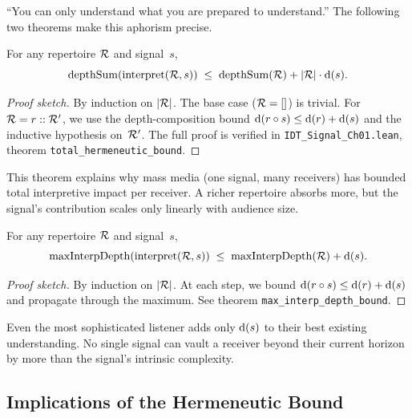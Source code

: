 ``You can only understand what you are prepared to understand.''
The following two theorems make this aphorism precise.

\begin{theorem}
\label{thm:total-hermeneutic-bound}
For any repertoire $\mathcal{R}$ and signal~$s$,
\[
  \operatorname{depthSum}(\operatorname{interpret}(\mathcal{R}, s))
  \;\leq\;
  \operatorname{depthSum}(\mathcal{R}) + |\mathcal{R}| \cdot \operatorname{d}(s).
\]
\end{theorem}

\begin{proof}[Proof sketch]
By induction on $|\mathcal{R}|$.  The base case ($\mathcal{R} = []$) is trivial.
For $\mathcal{R} = r :: \mathcal{R}'$, we use the depth-composition bound
$\operatorname{d}(r \circ s) \leq \operatorname{d}(r) + \operatorname{d}(s)$ and the
inductive hypothesis on~$\mathcal{R}'$.
The full proof is verified in \texttt{IDT\_Signal\_Ch01.lean},
theorem \texttt{total\_hermeneutic\_bound}.
\end{proof}

\begin{remark}
This theorem explains why mass media (one signal, many receivers) has
bounded total interpretive impact per receiver.  A richer repertoire
absorbs more, but the signal's contribution scales only linearly with
audience size.
\end{remark}

\begin{theorem}
\label{thm:max-interp-depth}
For any repertoire $\mathcal{R}$ and signal~$s$,
\[
  \operatorname{maxInterpDepth}(\operatorname{interpret}(\mathcal{R}, s))
  \;\leq\;
  \operatorname{maxInterpDepth}(\mathcal{R}) + \operatorname{d}(s).
\]
\end{theorem}

\begin{proof}[Proof sketch]
By induction on $|\mathcal{R}|$.  At each step, we bound
$\operatorname{d}(r \circ s) \leq \operatorname{d}(r) + \operatorname{d}(s)$ and propagate
through the maximum.  See theorem \texttt{max\_interp\_depth\_bound}.
\end{proof}

\begin{remark}
Even the most sophisticated listener adds only $\operatorname{d}(s)$ to their
best existing understanding.  No single signal can vault a receiver
beyond their current horizon by more than the signal's intrinsic
complexity.
\end{remark}

\subsection*{Implications of the Hermeneutic Bound}

